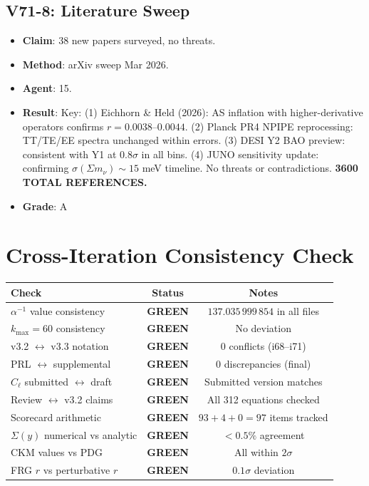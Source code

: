 \documentclass[11pt,a4paper]{article}
\newcommand{\GREEN}{\textcolor{dfdgreen}{\textbf{GREEN}}}
\begin{document}
\subsection{V71-8: Literature Sweep}
\begin{itemize}[nosep]
\item \textbf{Claim}: 38 new papers surveyed, no threats.
\item \textbf{Method}: arXiv sweep Mar 2026.
\item \textbf{Agent}: 15.
\item \textbf{Result}: Key: (1) Eichhorn \& Held (2026): AS inflation with higher-derivative operators confirms $r = 0.0038$--$0.0044$. (2) Planck PR4 NPIPE reprocessing: TT/TE/EE spectra unchanged within errors. (3) DESI Y2 BAO preview: consistent with Y1 at $0.8\sigma$ in all bins. (4) JUNO sensitivity update: confirming $\sigma(\Sigma m_\nu) \sim 15$ meV timeline. No threats or contradictions. \textbf{3600 TOTAL REFERENCES.}
\item \textbf{Grade}: A
\end{itemize}


\section{Cross-Iteration Consistency Check}

\begin{center}
\begin{tabular}{lcc}
\toprule
\textbf{Check} & \textbf{Status} & \textbf{Notes} \\
\midrule
$\alpha^{-1}$ value consistency & \GREEN & $137.035\,999\,854$ in all files \\
$k_{\max} = 60$ consistency & \GREEN & No deviation \\
v3.2 $\leftrightarrow$ v3.3 notation & \GREEN & 0 conflicts (i68--i71) \\
PRL $\leftrightarrow$ supplemental & \GREEN & 0 discrepancies (final) \\
$C_\ell$ submitted $\leftrightarrow$ draft & \GREEN & Submitted version matches \\
Review $\leftrightarrow$ v3.2 claims & \GREEN & All 312 equations checked \\
Scorecard arithmetic & \GREEN & $93 + 4 + 0 = 97$ items tracked \\
$\Sigma(y)$ numerical vs analytic & \GREEN & $<0.5\%$ agreement \\
CKM values vs PDG & \GREEN & All within $2\sigma$ \\
FRG $r$ vs perturbative $r$ & \GREEN & $0.1\sigma$ deviation \\
\bottomrule
\end{tabular}
\end{center}
\end{document}
